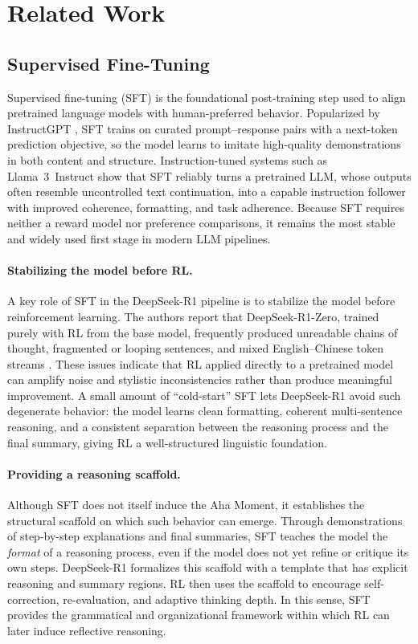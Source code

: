 \documentclass{article}
\begin{document}
\section{Related Work}

\subsection{Supervised Fine-Tuning}

Supervised fine-tuning (SFT) is the foundational post-training step used to align pretrained language models with human-preferred behavior. Popularized by InstructGPT \cite{ouyang2022rlhf}, SFT trains on curated prompt--response pairs with a next-token prediction objective, so the model learns to imitate high-quality demonstrations in both content and structure. Instruction-tuned systems such as Llama~3~Instruct \cite{llama3} show that SFT reliably turns a pretrained LLM, whose outputs often resemble uncontrolled text continuation, into a capable instruction follower with improved coherence, formatting, and task adherence. Because SFT requires neither a reward model nor preference comparisons, it remains the most stable and widely used first stage in modern LLM pipelines.

\paragraph{Stabilizing the model before RL.}
A key role of SFT in the DeepSeek-R1 pipeline is to stabilize the model before reinforcement learning. The authors report that DeepSeek-R1-Zero, trained purely with RL from the base model, frequently produced unreadable chains of thought, fragmented or looping sentences, and mixed English--Chinese token streams \cite{deepseekr1}. These issues indicate that RL applied directly to a pretrained model can amplify noise and stylistic inconsistencies rather than produce meaningful improvement. A small amount of ``cold-start'' SFT lets DeepSeek-R1 avoid such degenerate behavior: the model learns clean formatting, coherent multi-sentence reasoning, and a consistent separation between the reasoning process and the final summary, giving RL a well-structured linguistic foundation.

\paragraph{Providing a reasoning scaffold.}
Although SFT does not itself induce the Aha Moment, it establishes the structural scaffold on which such behavior can emerge. Through demonstrations of step-by-step explanations and final summaries, SFT teaches the model the \emph{format} of a reasoning process, even if the model does not yet refine or critique its own steps. DeepSeek-R1 formalizes this scaffold with a template that has explicit reasoning and summary regions. RL then uses the scaffold to encourage self-correction, re-evaluation, and adaptive thinking depth. In this sense, SFT provides the grammatical and organizational framework within which RL can later induce reflective reasoning.
\end{document}
